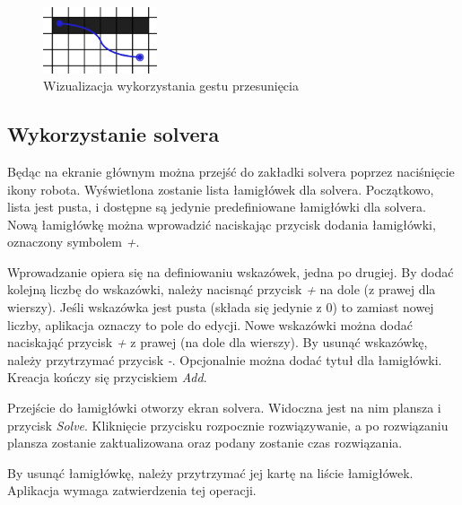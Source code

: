 \begin{figure}[!htb]
    \centering
    \includegraphics[width=0.3\textwidth]{images/swipe_gesture.png}
    \caption{Wizualizacja wykorzystania gestu przesunięcia}
\end{figure}


\subsection{Wykorzystanie solvera}
    Będąc na ekranie głównym można przejść do zakładki solvera poprzez naciśnięcie ikony robota.
Wyświetlona zostanie lista łamigłówek dla solvera. Początkowo, lista jest pusta, i dostępne są jedynie
predefiniowane łamigłówki dla solvera. Nową łamigłówkę można wprowadzić naciskając przycisk dodania
łamigłówki, oznaczony symbolem \textit{+}.

    Wprowadzanie opiera się na definiowaniu wskazówek, jedna po drugiej. By dodać kolejną liczbę do
wskazówki, należy nacisnąć przycisk \textit{+} na dole (z prawej dla wierszy). Jeśli wskazówka jest pusta (składa się jedynie
z 0) to zamiast nowej liczby, aplikacja oznaczy to pole do edycji. Nowe wskazówki można dodać
naciskająć przycisk \textit{+} z prawej (na dole dla wierszy). 
By usunąć wskazówkę, należy przytrzymać przycisk \textit{-}. Opcjonalnie można dodać tytuł dla łamigłówki.
Kreacja kończy się przyciskiem \textit{Add}.

    Przejście do łamigłówki otworzy ekran solvera. Widoczna jest na nim plansza i przycisk \textit{Solve}.
Kliknięcie przycisku rozpocznie rozwiązywanie, a po rozwiązaniu plansza zostanie zaktualizowana oraz
podany zostanie czas rozwiązania.

    By usunąć łamigłówkę, należy przytrzymać jej kartę na liście łamigłówek. Aplikacja wymaga
zatwierdzenia tej operacji.
